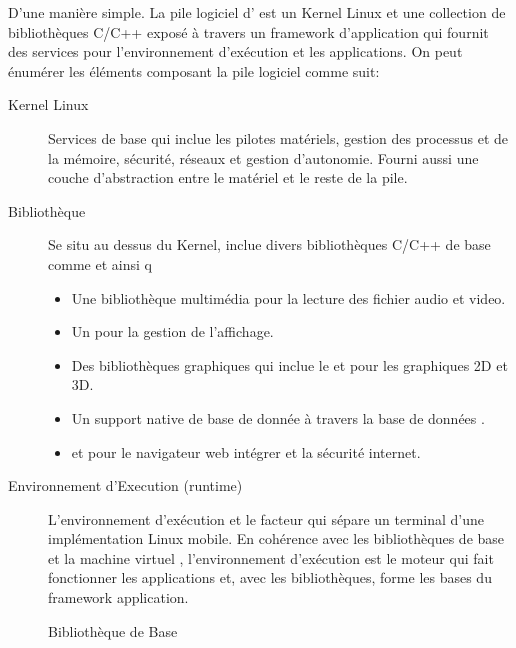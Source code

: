 D'une manière simple. La pile logiciel d'\android{} est un Kernel Linux et une collection de bibliothèques C/C++ exposé à travers un framework d'application qui fournit des services pour l'environnement d'exécution et les applications. On peut énumérer les éléments composant la pile logiciel comme suit:

\begin{description}

\item [Kernel Linux]
Services de base qui inclue les pilotes matériels, gestion des processus et de la mémoire, sécurité, réseaux et gestion d'autonomie. Fourni aussi une couche d'abstraction entre le matériel et le reste de la pile.

\item [Bibliothèque]
Se situ au dessus du Kernel, \android{} inclue divers bibliothèques C/C++ de base comme  et  ainsi q
\begin{itemize}

\item Une bibliothèque multimédia pour la lecture des fichier audio et video.

\item Un  pour la gestion de l'affichage.

\item Des bibliothèques graphiques qui inclue le  et  pour les graphiques 2D et 3D.

\item Un support native de base de donnée à travers la base de données .

\item {} et  pour le navigateur web intégrer et la sécurité internet.

\end{itemize}

\item [Environnement d'Execution (runtime) \android{}]

L'environnement d’exécution et le facteur qui sépare un terminal \android{}
d'une implémentation Linux mobile. En cohérence avec les bibliothèques de base
et la machine virtuel , l'environnement d’exécution \android{} est
le moteur qui fait fonctionner les applications et, avec les bibliothèques,
forme les bases du framework application.

\begin{description}

\item [Bibliothèque de Base]


\end{description}
\end{description}
